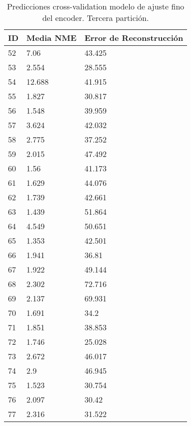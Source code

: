\begin{table}[!ht]
    \centering
    \caption{Predicciones cross-validation modelo de ajuste fino del encoder. Tercera partición.}
    \begin{tabular}{|l|l|l|}
    \hline
    \cellcolor{gray!25}\textbf{ID} & \cellcolor{gray!25}\textbf{Media NME} & \cellcolor{gray!25}\textbf{Error de Reconstrucción} \\ \hline
        52 & 7.06 & 43.425 \\ \hline
        53 & 2.554 & 28.555 \\ \hline
        54 & 12.688 & 41.915 \\ \hline
        55 & 1.827 & 30.817 \\ \hline
        56 & 1.548 & 39.959 \\ \hline
        57 & 3.624 & 42.032 \\ \hline
        58 & 2.775 & 37.252 \\ \hline
        59 & 2.015 & 47.492 \\ \hline
        60 & 1.56 & 41.173 \\ \hline
        61 & 1.629 & 44.076 \\ \hline
        62 & 1.739 & 42.661 \\ \hline
        63 & 1.439 & 51.864 \\ \hline
        64 & 4.549 & 50.651 \\ \hline
        65 & 1.353 & 42.501 \\ \hline
        66 & 1.941 & 36.81 \\ \hline
        67 & 1.922 & 49.144 \\ \hline
        68 & 2.302 & 72.716 \\ \hline
        69 & 2.137 & 69.931 \\ \hline
        70 & 1.691 & 34.2 \\ \hline
        71 & 1.851 & 38.853 \\ \hline
        72 & 1.746 & 25.028 \\ \hline
        73 & 2.672 & 46.017 \\ \hline
        74 & 2.9 & 46.945 \\ \hline
        75 & 1.523 & 30.754 \\ \hline
        76 & 2.097 & 30.42 \\ \hline
        77 & 2.316 & 31.522 \\ \hline
    \end{tabular}
\end{table}

